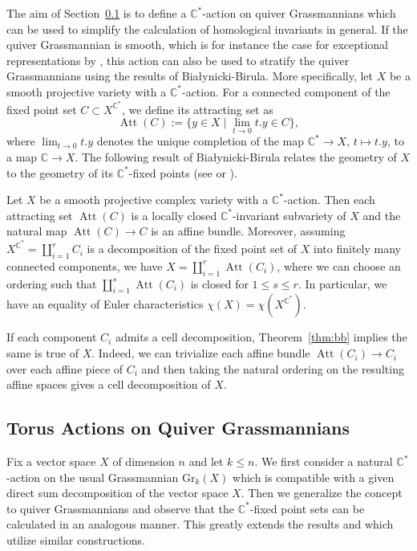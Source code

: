 \documentclass[smallextended,envcountsect,envcountsame]{svjour3}
\numberwithin{equation}{section}
\newcommand{\C}{\mathbb{C}}
\newcommand{\CC}{\mathbb{C}}
\newcommand{\Att}{\operatorname{Att}}
\newcommand{\Gr}{\mathrm{Gr}}
\begin{document}
The aim of Section~\ref{torusaction} is to define a $\CC^*$-action on quiver Grassmannians which can be used to simplify the calculation of homological invariants in general.
If the quiver Grassmannian is smooth, which is for instance the case for exceptional representations by \cite{cr}, this action can also be used to stratify the quiver Grassmannians using the results of Bia\l{}ynicki-Birula.
More specifically, let $X$ be a smooth projective variety with a $\C^\ast$-action.
For a connected component of the fixed point set $C\subset X^{\C^\ast}$, we define its attracting set as
\[\Att(C):=\{y\in X\mid \lim_{t\to 0}t.y\in C\},\]
where $\lim_{t\to 0}t.y$ denotes the unique completion of the map $\CC^*\to X$, $t\mapsto t.y$, to a map $\CC\to X$.
The following result of Bia\l{}ynicki-Birula relates the geometry of $X$ to the geometry of its $\CC^*$-fixed points (see \cite[Section 4]{bb} or \cite[Section 4]{ca}).
\begin{theorem}
  \label{thm:bb}
  Let $X$ be a smooth projective complex variety with a $\C^\ast$-action.
  Then each attracting set $\Att(C)$ is a locally closed $\CC^*$-invariant subvariety of $X$ and the natural map $\Att(C)\to C$ is an affine bundle.
  Moreover, assuming $X^{\C^\ast}=\coprod_{i=1}^r C_i$ is a decomposition of the fixed point set of $X$ into finitely many connected components, we have $X=\coprod_{i=1}^r \Att(C_i)$, where we can choose an ordering such that $\coprod_{i=1}^s\Att(C_i)$ is closed for $1\leq s\leq r$.
  In particular, we have an equality of Euler characteristics $\chi(X)=\chi(X^{\C^\ast})$.
\end{theorem}

If each component $C_i$ admits a cell decomposition, Theorem~\ref{thm:bb} implies the same is true of $X$.
Indeed, we can trivialize each affine bundle $\Att(C_i)\to C_i$ over each affine piece of $C_i$ and then taking the natural ordering on the resulting affine spaces gives a cell decomposition of $X$.


\subsection{Torus Actions on Quiver Grassmannians}
\label{torusaction}

Fix a vector space $X$ of dimension $n$ and let $k\leq n$.
We first consider a natural $\CC^*$-action on the usual Grassmannian $\Gr_k(X)$ which is compatible with a given direct sum decomposition of the vector space $X$.
Then we generalize the concept to quiver Grassmannians and observe that the $\CC^*$-fixed point sets can be calculated in an analogous manner.
This greatly extends the results \cite[Theorem 1]{cerulli} and \cite[Theorem 1.2]{haupt} which utilize similar constructions.
\end{document}
